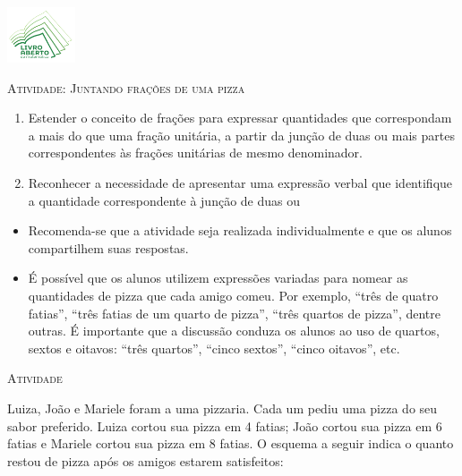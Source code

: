 \documentclass[10 pt,usenames,dvipsnames, oneside]{article}
\begin{document}
\begin{center}
  \begin{minipage}[l]{3cm}
\includegraphics[width=2cm]{logo}    
\end{minipage}\hfill
\begin{minipage}[r]{.8\textwidth}
 {\Large \scshape Atividade: Juntando frações de uma pizza}  
\end{minipage}
\end{center}
\vspace{.2cm}

\ifdefined\prof
\begin{goals}
\begin{enumerate}

\item Estender o conceito de frações para expressar quantidades que correspondam a mais do que uma fração unitária, a partir da junção de duas ou mais partes correspondentes às frações unitárias de mesmo denominador.
\item Reconhecer a necessidade de apresentar uma expressão verbal que identifique a quantidade correspondente à junção de duas ou

\end{enumerate}
\tcblower

  \begin{itemize} %
\item Recomenda-se que a atividade seja realizada individualmente e que os alunos compartilhem suas respostas. 
\item É possível que os alunos utilizem expressões variadas para nomear as quantidades de pizza que cada amigo comeu. Por exemplo, ``três de quatro fatias'', ``três fatias de um quarto de pizza'', ``três quartos de pizza'', dentre outras. É importante que a discussão conduza os alunos ao uso de quartos, sextos e oitavos: ``três quartos'', ``cinco sextos'', ``cinco oitavos'', etc. 
\end{itemize} %


\end{goals}

\bigskip
\begin{center}
{\large \scshape Atividade}
\end{center}
\fi

Luiza, João e Mariele foram a uma pizzaria. Cada um pediu uma pizza do seu sabor preferido. 
Luiza cortou sua pizza em 4 fatias; João cortou sua pizza em 6 fatias e Mariele cortou sua pizza em 8 fatias.
O esquema a seguir indica o quanto restou de pizza após os amigos estarem satisfeitos:
\end{document}
